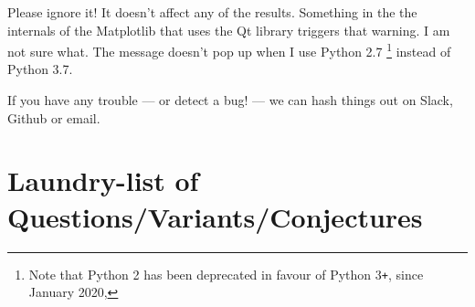 \begin{appendices}
Please ignore it! It doesn't affect any of the results. Something in the
the internals of the Matplotlib that uses the Qt library triggers that warning. I 
am not sure what. The message doesn't pop up
when I use Python 2.7 \footnote{Note that Python 2 has been deprecated in favour of Python 3\texttt{+}, since January 2020, } 
instead of Python 3.7. 

If you have any trouble --- or detect a bug! ---  we can hash things out on Slack, Github or email.

\section{Laundry-list of Questions/Variants/Conjectures}
\end{appendices}
